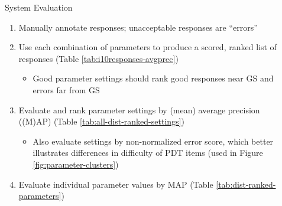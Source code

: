 \documentclass[final,t]{beamer}
\begin{document}
\begin{frame}{}
\begin{columns}[t]
\begin{column}{.64\linewidth}
\begin{columns}
\begin{column}{.48\linewidth}
\end{column}

\begin{column}{.49\linewidth}
\vspace{-1em}
\begin{block}{System Evaluation}
\begin{center}
\begin{minipage}{.9\textwidth}
\begin{enumerate}
	\item{Manually annotate responses; unacceptable responses are ``errors''}
	\item{Use each combination of parameters to produce a scored, ranked list of responses (Table \ref{tab:i10responses-avgprec})}
	\begin{itemize}
		\item{Good parameter settings should rank good responses near GS and errors far from GS}
	\end{itemize}
	\item{Evaluate and rank parameter settings by (mean) average precision ((M)AP) (Table \ref{tab:all-dist-ranked-settings})}
	\begin{itemize}
		\item{Also evaluate settings by non-normalized error score, which better illustrates differences in difficulty of PDT items (used in Figure \ref{fig:parameter-clusters})}
	\end{itemize}
	\item{Evaluate individual parameter values by MAP (Table \ref{tab:dist-ranked-parameters})}
\end{enumerate}
\end{minipage}
\end{center}
\vspace{.8em}


\end{block}
\end{column}
\end{columns}
\end{column}
\end{columns}
\end{frame}
\end{document}
